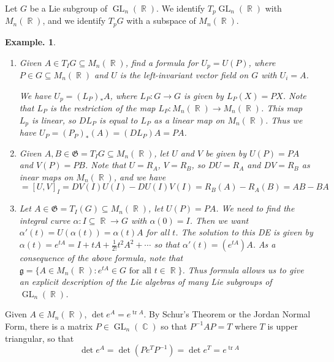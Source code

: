 \documentclass[11pt, a4paper]{memoir}
\DeclareMathOperator{\R}{{\mathbb{R}}}
\DeclareMathOperator{\C}{{\mathbb{C}}}
\theoremstyle{change}
\theoremstyle{plain}
\theoremstyle{nonumberplain}
\newtheorem{example}{Example.}
\DeclareMathOperator{\GL}{GL}
\DeclareMathOperator{\tr}{tr}
\numberwithin{equation}{section}
\begin{document}
Let $G$ be a Lie subgroup of $\GL_n(\R)$.
We identify $T_p\GL_n(\R)$ with $M_n(\R)$, and we identify $T_pG$ with a subspace of $M_n(\R)$.
\begin{example}
    \begin{enumerate}[nl]
        \item Given $A\in T_IG\subseteq M_n(\R)$, find a formula for $U_p=U(P)$, where $P\in G\subseteq M_n(\R)$ and $U$ is the left-invariant vector field on $G$ with $U_i=A$.

            We have $U_p=(L_P)_*A$, where $L_P:G\to G$ is given by $L_P(X)=PX$.
            Note that $L_P$ is the restriction of the map $L_P:M_n(\R)\to M_n(\R)$.
            This map $L_p$ is linear, so $DL_P$ is equal to $L_P$ as a linear map on $M_n(\R)$.
            Thus we have $U_P=(P_P)_*(A)=(DL_P)A=PA$.
        \item Given $A,B\in\mathfrak{G}=T_IG\subseteq M_n(\R)$, let $U$ and $V$ be given by $U(P)=PA$ and $V(P)=PB$.
            Note that $U=R_A$, $V=R_B$, so $DU=R_A$ and $DV=R_B$ as inear maps on $M_n(\R)$, and we have
            \begin{equation*}
                [A,B]=[U,V]_I=DV(I)U(I)-DU(I)V(I)=R_B(A)-R_A(B)=AB-BA
            \end{equation*}
        \item Let $A\in\mathfrak{G}=T_I(G)\subseteq M_n(\R)$, let $U(P)=PA$.
            We need to find the integral curve $\alpha:I\subseteq\R\to G$ with $\alpha(0)=I$.
            Then we want $\alpha'(t)=U(\alpha(t))=\alpha(t)A$ for all $t$.
            The solution to this DE is given by $\alpha(t)=e^{tA}=I+tA+\frac{1}{2!}t^2A^2+\cdots$ so that $\alpha'(t)=(e^{tA})A$.
            As a consequence of the above formula, note that $\mathfrak{g}=\{A\in M_n(\R):e^{tA}\in G\text{ for all }t\in\R\}$.
            Thus formula allows us to give an explicit description of the Lie algebras of many Lie subgroups of $\GL_n(\R)$.
    \end{enumerate}
\end{example}
Given $A\in M_n(\R)$, $\det e^A=e^{\tr A}$.
By Schur's Theorem or the Jordan Normal Form, there is a matrix $P\in\GL_n(\C)$ so that $P^{-1}AP=T$ where $T$ is upper triangular, so that
\begin{equation*}
    \det e^A=\det (Pe^TP^{-1})=\det e^T=e^{\tr A}
\end{equation*}
\end{document}
